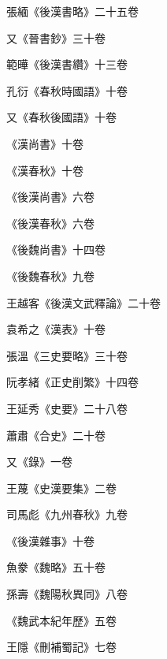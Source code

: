 \begin{pinyinscope}
 張緬《後漢書略》二十五卷



 又《晉書鈔》三十卷



 範曄《後漢書纘》十三卷



 孔衍《春秋時國語》十卷



 又《春秋後國語》十卷



 《漢尚書》十卷



 《漢春秋》十卷



 《後漢尚書》六卷



 《後漢春秋》六卷



 《後魏尚書》十四卷



 《後魏春秋》九卷



 王越客《後漢文武釋論》二十卷



 袁希之《漢表》十卷



 張溫《三史要略》三十卷



 阮孝緒《正史削繁》十四卷



 王延秀《史要》二十八卷



 蕭肅《合史》二十卷



 又《錄》一卷



 王蔑《史漢要集》二卷



 司馬彪《九州春秋》九卷



 《後漢雜事》十卷



 魚豢《魏略》五十卷



 孫壽《魏陽秋異同》八卷



 《魏武本紀年歷》五卷



 王隱《刪補蜀記》七卷




\end{pinyinscope}
